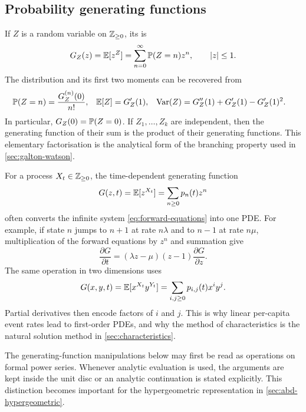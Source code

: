 \subsection{Probability generating functions}

If \(Z\) is a random variable on \(\mathbb{Z}_{\geq 0}\), its \pgf{} is
\begin{equation}
  G_Z(z)=\mathbb{E}[z^Z]=\sum_{n=0}^{\infty}\mathbb{P}(Z=n)z^n,
  \qquad |z|\leq1.
  \label{eq:univariate-pgf}
\end{equation}
The distribution and its first two moments can be recovered from
\begin{align}
  \mathbb{P}(Z=n)&=\frac{G_Z^{(n)}(0)}{n!},
  &\mathbb{E}[Z]&=G_Z'(1),
  &\operatorname{Var}(Z)&=G_Z''(1)+G_Z'(1)-G_Z'(1)^2.
  \label{eq:pgf-recovery}
\end{align}
In particular, \(G_Z(0)=\mathbb{P}(Z=0)\).  If \(Z_1,\ldots,Z_k\) are independent,
then the generating function of their sum is the product of their generating
functions.  This elementary factorisation is the analytical form of the branching
property used in \cref{sec:galton-watson}.

For a process \(X_t\in\mathbb{Z}_{\geq 0}\), the time-dependent generating function
\begin{equation}
  G(z,t)=\mathbb{E}[z^{X_t}]=\sum_{n\geq0}p_n(t)z^n
  \label{eq:process-pgf}
\end{equation}
often converts the infinite system \cref{eq:forward-equations} into one PDE.  For
example, if state \(n\) jumps to \(n+1\) at rate \(n\lambda\) and to \(n-1\) at rate
\(n\mu\), multiplication of the forward equations by \(z^n\) and summation give
\begin{equation}
  \frac{\partial G}{\partial t}
  =(\lambda z-\mu)(z-1)\frac{\partial G}{\partial z}.
  \label{eq:linear-bd-pgf-pde}
\end{equation}
The same operation in two dimensions uses
\begin{equation}
  G(x,y,t)=\mathbb{E}[x^{X_t}y^{Y_t}]
  =\sum_{i,j\geq0}p_{i,j}(t)x^iy^j.
  \label{eq:bivariate-pgf}
\end{equation}
Partial derivatives then encode factors of \(i\) and \(j\).  This is why linear
per-capita event rates lead to first-order PDEs, and why the method of
characteristics is the natural solution method in \cref{sec:characteristics}.

The generating-function manipulations below may first be read as operations on
formal power series.  Whenever analytic evaluation is used, the arguments are kept
inside the unit disc or an analytic continuation is stated explicitly.  This
distinction becomes important for the hypergeometric representation in
\cref{sec:abd-hypergeometric}.
